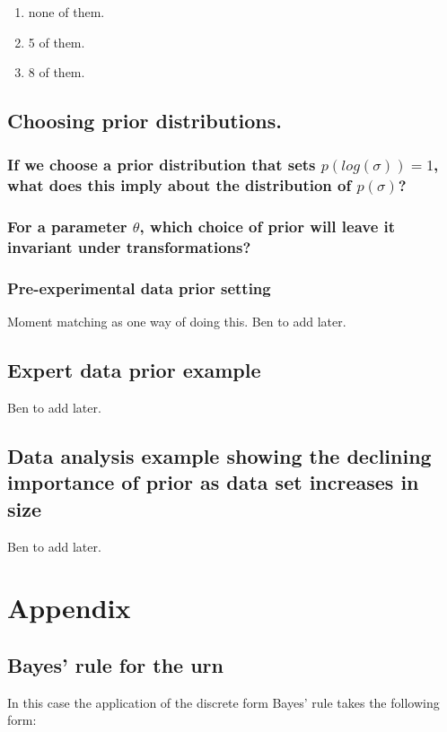 \documentclass[11pt,fullpage]{book}
\begin{document}
\begin{enumerate}
\item none of them.
\item 5 of them.
\item 8 of them.
\end{enumerate}

\subsection{Choosing prior distributions.}
\subsubsection{If we choose a prior distribution that sets $p(log(\sigma))=1$, what does this imply about the distribution of $p(\sigma)$?}

\subsubsection{For a parameter $\theta$, which choice of prior will leave it invariant under transformations?}

\subsubsection{Pre-experimental data prior setting}
Moment matching as one way of doing this. Ben to add later.

\subsection{Expert data prior example}
Ben to add later.

\subsection{Data analysis example showing the declining importance of prior as data set increases in size}
Ben to add later.

\section{Appendix}
\subsection{Bayes' rule for the urn}\label{app:Prior_bayesUrn}
In this case the application of the discrete form Bayes' rule takes the following form:
\end{document}
